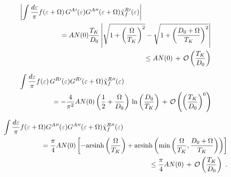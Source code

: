 \documentclass[12pt,twoside]{article}
\begin{document}
\begin{eqnarray}
\left|\int \frac{d\varepsilon}{\pi}
f(\varepsilon+\Omega)\, G^A{'}(\varepsilon)G^A{''}(\varepsilon+\Omega)
\tilde\chi_f^R{'}(\varepsilon) \right| && \nonumber \\
&&\hspace*{-4.5cm}=A N(0) \frac{T_K}{D_0} 
\left|
\sqrt{1+\left(\frac{\Omega}{T_K}\right)^2} -
\sqrt{1+\left(\frac{D_0+\Omega}{T_K}\right)^2} 
\right| \nonumber\\
&&\hspace*{-4.5cm}\leq A N(0) \,+\, {\cal O}\left(\frac{T_K}{D_0}\right)
\label{eq:Lambda_x2}
\end{eqnarray}   

\begin{eqnarray}
\int \frac{d\varepsilon}{\pi}
f(\varepsilon)\, G^R{'}(\varepsilon)G^R{'}(\varepsilon+\Omega) 
\tilde\chi_f^R{''}(\varepsilon) &&\nonumber\\
&&\hspace*{-4.0cm}
=-\frac{4}{\pi^2} A N(0) \left(\frac{1}{2}+\frac{\Omega}{D_0} \right)\,
\ln\left(\frac{D_0}{T_K}\right) 
\,+\, {\cal O}\left(\left(\frac{T_K}{D_0}\right)^0\right)
\label{eq:Lambda_x3}
\end{eqnarray}   

\begin{eqnarray}
\int \frac{d\varepsilon}{\pi}
f(\varepsilon+\Omega) G^A{''}(\varepsilon)G^A{''}(\varepsilon+\Omega)
\tilde\chi_f^R{''}(\varepsilon) && \nonumber\\
&&\hspace*{-4.5cm}=\frac{\pi}{4}A N(0) \left[
- {\rm arsinh}\left(\frac{\Omega}{T_K}\right) 
+ {\rm arsinh}\left({\rm min}
\left(\frac{\Omega}{T_K},\frac{D_0+\Omega}{T_K}\right)\right) 
\right]\nonumber \\
&&\hspace*{-4.5cm}\leq \frac{\pi}{4}A N(0) 
\,+\, {\cal O}\left(\frac{T_K}{D_0}\right) \ .
\label{eq:Lambda_x4}
\end{eqnarray}   
\end{document}
